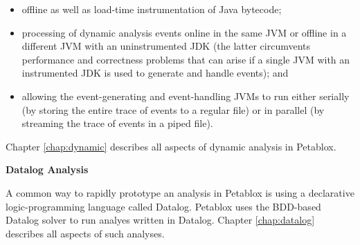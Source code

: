 \begin{itemize}
\item
offline as well as load-time instrumentation of Java bytecode;
\item
processing of dynamic analysis events online in the same JVM or offline in a
different JVM with an uninstrumented JDK (the latter circumvents performance and
correctness problems that can arise if a single JVM with an instrumented JDK is
used to generate and handle events); and
\item
allowing the event-generating and event-handling JVMs to run either serially
(by storing the entire trace of events to a regular file) or in parallel (by
streaming the trace of events in a piped file).
\end{itemize}

Chapter \ref{chap:dynamic} describes all aspects of dynamic analysis in Petablox.

{\bf Datalog Analysis}

A common way to rapidly prototype an analysis in Petablox is using a declarative
logic-programming language called Datalog.  Petablox uses the BDD-based Datalog
solver  to run analyes written
in Datalog.  Chapter \ref{chap:datalog} describes all aspects of such analyses.

